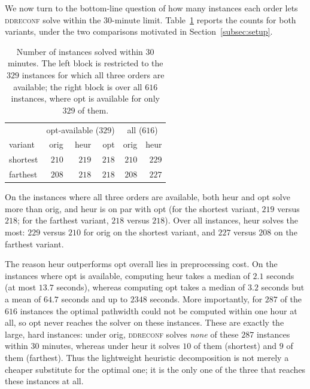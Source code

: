 \documentclass[conference]{IEEEtran}
\newcommand{\OrigDecom}{\textsf{orig}\xspace}
\newcommand{\HeurDecom}{\textsf{heur}\xspace}
\newcommand{\OptDecom}{\textsf{opt}\xspace}
\begin{document}
We now turn to the bottom-line question of how many instances each order lets
\textsc{ddreconf} solve within the $30$-minute limit.
Table~\ref{tab:solved} reports the counts for both variants, under the two
comparisons motivated in Section~\ref{subsec:setup}.

\begin{table}[t]
  \centering
  \caption{Number of instances solved within $30$ minutes. The left block is
  restricted to the $329$ instances for which all three orders are available; the
  right block is over all $616$ instances, where \OptDecom is available for only
  $329$ of them.}
  \label{tab:solved}
  \begin{tabular}{lrrr|rr}
    \hline
    & \multicolumn{3}{c|}{opt-available ($329$)} & \multicolumn{2}{c}{all ($616$)} \\
    variant & \OrigDecom & \HeurDecom & \OptDecom & \OrigDecom & \HeurDecom \\
    \hline
    shortest & $210$ & $219$ & $218$ & $210$ & $229$ \\
    farthest & $208$ & $218$ & $218$ & $208$ & $227$ \\
    \hline
  \end{tabular}
\end{table}

On the instances where all three orders are available, both \HeurDecom and
\OptDecom solve more than \OrigDecom, and \HeurDecom is on par with \OptDecom
(for the shortest variant, $219$ versus $218$; for the farthest variant, $218$
versus $218$).
Over all instances, \HeurDecom solves the most: $229$ versus $210$ for
\OrigDecom on the shortest variant, and $227$ versus $208$ on the farthest
variant.

The reason \HeurDecom outperforms \OptDecom overall lies in preprocessing cost.
On the instances where \OptDecom is available, computing \HeurDecom takes a
median of $2.1$ seconds (at most $13.7$ seconds), whereas computing \OptDecom
takes a median of $3.2$ seconds but a mean of $64.7$ seconds and up to
$2348$ seconds.
More importantly, for $287$ of the $616$ instances the optimal pathwidth could
not be computed within one hour at all, so \OptDecom never reaches the solver on
these instances.
These are exactly the large, hard instances: under \OrigDecom, \textsc{ddreconf}
solves \emph{none} of these $287$ instances within $30$ minutes, whereas under
\HeurDecom it solves $10$ of them (shortest) and $9$ of them (farthest).
Thus the lightweight heuristic decomposition is not merely a cheaper substitute
for the optimal one; it is the only one of the three that reaches these instances
at all.
\end{document}
